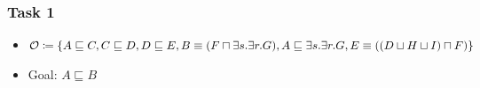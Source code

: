 \documentclass{beamer}
\begin{document}
             \begin{frame}
                \frametitle{Task 1}
                    \begin{itemize}
                    \item $\mathcal{O} \coloneq \{A \sqsubseteq C , C \sqsubseteq D, D \sqsubseteq E, B \equiv (F \sqcap \exists s. \exists r.G), A \sqsubseteq \exists s. \exists r.G, \newline E \equiv ((D \sqcup H \sqcup I) \sqcap F)\}$ \\
                    \item Goal: $A \sqsubseteq B$
                    \end{itemize}
                    

            \end{frame}
                
\end{document}
